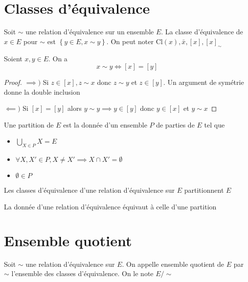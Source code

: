 \section{Classes d'équivalence}

\begin{dfn}
    Soit $\sim$ une relation d'équivalence sur un ensemble  $E$. La classe d'équivalence de  $x \in  E$ pour $\sim$ est  $\left\{  y \in  E, x\sim y \right\} $. On peut noter $\mathrm{Cl}(x), \bar x, [x], [x]_\sim$
\end{dfn}

\begin{lmm}
Soient $x, y \in  E$. On a \[
    x\sim y \iff  [x]=[y]
\] 
\end{lmm}

\begin{proof}
    $\implies )$ Si $z \in  [x], z\sim x$ donc $z\sim y$ et  $z \in  [y]$. Un argument de symétrie donne la double inclusion

    $\impliedby )$ Si  $[x]=[y]$ alors $y\sim y\implies y \in  [y]$ donc $y \in  [x]$ et $y\sim x$
\end{proof}

\begin{dfn}
    Une partition de $E$ est la donnée d'un ensemble $P$ de parties de $E$ tel que \begin{itemize}
        \item $\displaystyle \bigcup_{X \in  P}X=E$
        \item  $ \forall  X, X' \in  P, X \neq X' \implies X\cap X'=\emptyset$
        \item   $\emptyset \in  P$
    \end{itemize}
\end{dfn}

\begin{prop}
Les classes d'équivalence d'une relation d'équivalence sur $E$ partitionnent  $E$
\end{prop}

\begin{rem}
La donnée d'une relation d'équivalence équivaut à celle d'une partition
\end{rem}

\section{Ensemble quotient}

\begin{dfn}
    Soit $\sim$ une relation d'équivalence sur  $E$. On appelle ensemble quotient de  $E$ par  $\sim$ l'ensemble des classes d'équivalence. On le note  $E/\sim$
\end{dfn}

